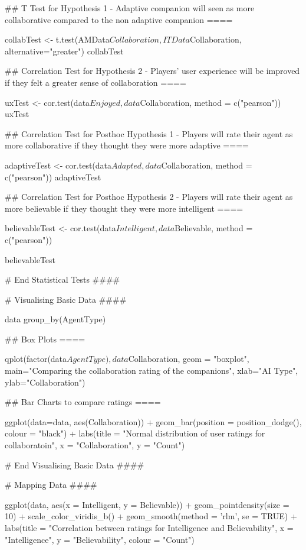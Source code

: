 \documentclass{IEEEtran}
\begin{document}
\begin{verbnobox}[\fontsize{10pt}{10pt}\selectfont]
## T Test for Hypothesis 1 - Adaptive companion will seen as more collaborative compared to 
the non adaptive companion ====

collabTest <- t.test(AMData$Collaboration, ITData$Collaboration, 
                     alternative="greater")
collabTest

## Correlation Test for Hypothesis 2 - Players' user experience will be improved if they felt
a greater sense of collaboration ====

uxTest <- cor.test(data$Enjoyed, data$Collaboration,
                   method = c("pearson"))
uxTest

## Correlation Test for Posthoc Hypothesis 1 - Players will rate their agent as more 
collaborative if they thought they were more adaptive ====

adaptiveTest <- cor.test(data$Adapted, data$Collaboration,
                       method = c("pearson"))
adaptiveTest

## Correlation Test for Posthoc Hypothesis 2 - Players will rate their agent as more 
believable if they thought they were more intelligent ====

believableTest <- cor.test(data$Intelligent, data$Believable, method = c("pearson"))

believableTest

# End Statistical Tests ####

# Visualising Basic Data ####

data %
  group_by(AgentType)
  
## Box Plots ====

qplot(factor(data$AgentType), data$Collaboration, geom = "boxplot", 
      main="Comparing the collaboration rating of the companions", 
      xlab="AI Type", ylab="Collaboration")

## Bar Charts to compare ratings ====

ggplot(data=data, aes(Collaboration)) +
  geom_bar(position = position_dodge(), colour = "black") +
  labs(title = "Normal distribution of user ratings for collaboratoin",
       x = "Collaboration", y = "Count")

# End Visualising Basic Data ####

# Mapping Data ####

ggplot(data, aes(x = Intelligent, y = Believable)) +
  geom_pointdensity(size = 10) +
  scale_color_viridis_b() + 
  geom_smooth(method = 'rlm', se = TRUE) +
  labs(title = "Correlation between ratings for Intelligence and Believability",
       x = "Intelligence", y = "Believability", colour = "Count")


\end{verbnobox}
\end{document}
